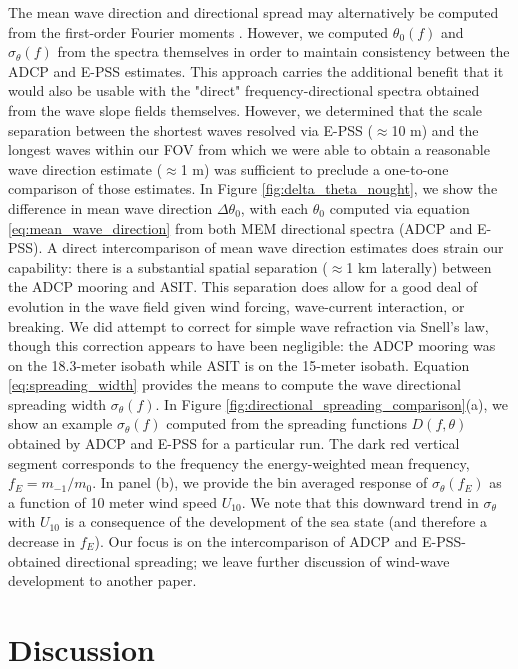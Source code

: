 \documentclass[letterpaper,journal]{IEEEtran}
\begin{document}
	The mean wave direction and directional spread may alternatively be computed from the first-order Fourier moments \cite{earle_nondirectional_2003}. However, we computed $\theta_0(f)$ and $\sigma_\theta(f)$ from the spectra themselves in order to maintain consistency between the ADCP and E-PSS estimates. This approach carries the additional benefit that it would also be usable with the "direct" frequency-directional spectra obtained from the wave slope fields themselves. However, we determined that the scale separation between the shortest waves resolved via E-PSS ($\approx$10 m) and the longest waves within our FOV from which we were able to obtain a reasonable wave direction estimate ($\approx$1 m) was sufficient to preclude a one-to-one comparison of those estimates. In Figure \ref{fig:delta_theta_nought}, we show the difference in mean wave direction $\Delta\theta_0$, with each $\theta_0$ computed via equation \ref{eq:mean_wave_direction} from both MEM directional spectra (ADCP and E-PSS). A direct intercomparison of mean wave direction estimates does strain our capability: there is a substantial spatial separation ($\approx$1 km laterally) between the ADCP mooring and ASIT. This separation does allow for a good deal of evolution in the wave field given wind forcing, wave-current interaction, or breaking. We did attempt to correct for simple wave refraction via Snell's law, though this correction appears to have been negligible: the ADCP mooring was on the 18.3-meter isobath while ASIT is on the 15-meter isobath. Equation \ref{eq:spreading_width} provides the means to compute the wave directional spreading width $\sigma_\theta(f)$. In Figure \ref{fig:directional_spreading_comparison}(a), we show an example $\sigma_\theta(f)$ computed from the spreading functions $D(f,\theta)$ obtained by ADCP and E-PSS for a particular run. The dark red vertical segment corresponds to the frequency the energy-weighted mean frequency, $f_E=m_{-1}/m_{0}$. In panel (b), we provide the bin averaged response of $\sigma_\theta(f_E)$ as a function of 10 meter wind speed $U_{10}$. We note that this downward trend in $\sigma_\theta$ with $U_{10}$ is a consequence of the development of the sea state (and therefore a decrease in $f_E$). Our focus is on the intercomparison of ADCP and E-PSS-obtained directional spreading; we leave further discussion of wind-wave development to another paper.
	
	\section{Discussion}
	\label{sec:discussion}
	
\end{document}
